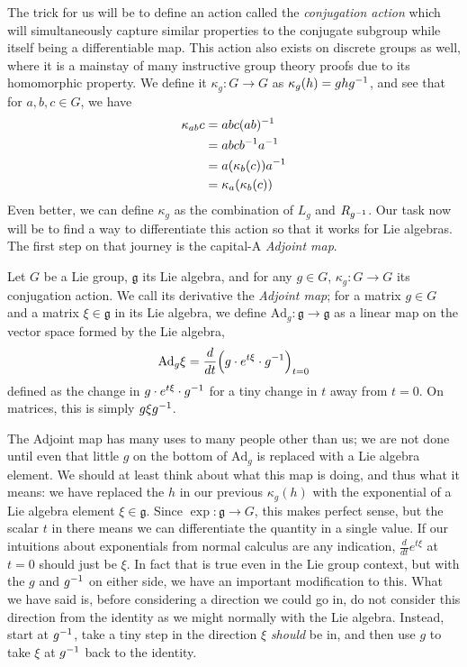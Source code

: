 \documentclass[11pt]{article}
\begin{document}
The trick for us will be to define an action called the \emph{conjugation action} which will simultaneously capture similar properties to the conjugate subgroup while itself being a differentiable map. This action also exists on discrete groups as well, where it is a mainstay of many instructive group theory proofs due to its homomorphic property. We define it $\kappa_g\colon G \to G$ as $\kappa_g(h) = ghg^{-1}$, and see that for $a,b,c \in G$, we have \begin{align*}
\kappa_{ab}c &= abc(ab)^{-1}\\
&= abcb^{-1} a^{-1} \\
&= a(\kappa_b (c)) a^{-1} \\
&= \kappa_a (\kappa_b (c))
\end{align*}
Even better, we can define $\kappa_g$ as the combination of $L_g$ and $R_{g^{-1}}$. Our task now will be to find a way to differentiate this action so that it works for Lie algebras. The first step on that journey is the capital-A \emph{Adjoint map}.

\begin{definition}
Let $G$ be a Lie group, $\mathfrak{g}$ its Lie algebra, and for any $g\in G$, $\kappa_g\colon G \to G$ its conjugation action. We call its derivative the \emph{Adjoint map}; for a matrix $g \in G$ and a matrix $\xi \in \mathfrak{g}$ in its Lie algebra, we define $\mathrm{Ad}_g \colon \mathfrak{g} \to \mathfrak{g}$ as a linear map on the vector space formed by the Lie algebra, \begin{gather*}
\mathrm{Ad}_g \xi = \frac{d}{dt} \Big( g \cdot e^{t\xi } \cdot g^{-1} \Big)_{t=0}
\end{gather*}
defined as the change in $g \cdot e^{t \xi} \cdot g^{-1}$ for a tiny change in $t$ away from $t=0$. On matrices, this is simply $g\xi g^{-1}$.
\end{definition}

The Adjoint map has many uses to many people other than us; we are not done until even that little $g$ on the bottom of $\mathrm{Ad}_g$ is replaced with a Lie algebra element. We should at least think about what this map is doing, and thus what it means: we have replaced the $h$ in our previous $\kappa_g(h)$ with the exponential of a Lie algebra element $\xi \in \mathfrak{g}$. Since $\exp \colon \mathfrak{g} \to G$, this makes perfect sense, but the scalar $t$ in there means we can differentiate the quantity in a single value. If our intuitions about exponentials from normal calculus are any indication, $\frac{d}{dt} e^{t\xi}$ at $t=0$ should just be $\xi$. In fact that is true even in the Lie group context, but with the $g$ and $g^{-1}$ on either side, we have an important modification to this. What we have said is, before considering a direction we could go in, do not consider this direction from the identity as we might normally with the Lie algebra. Instead, start at $g^{-1}$, take a tiny step in the direction $\xi$ \emph{should} be in, and then use $g$ to take $\xi$ at $g^{-1}$ back to the identity.
\end{document}

